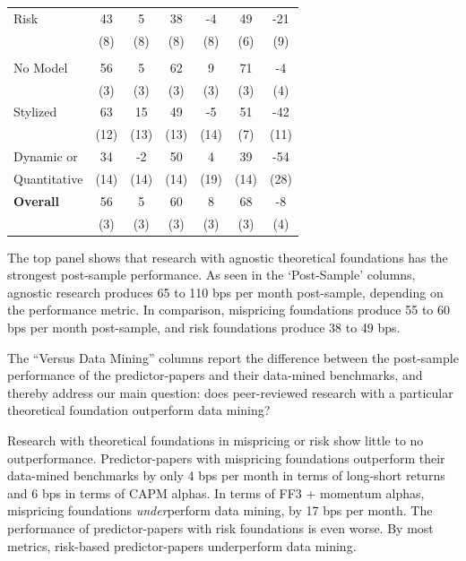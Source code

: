 \begin{table}[!h]
\begin{center}
\begin{tabular}{lcccccc}
      Risk              & 43 & 5 & 38 & -4 & 49 & -21 \\
                        & (8) & (8) & (8) & (8) & (6) & (9) \\                        
      \addlinespace
      \multicolumn{7}{l}{\textbf{Equilibrium Modeling}} \\
      No Model          & 56 & 5 & 62 & 9 & 71 & -4 \\
                        & (3) & (3) & (3) & (3) & (3) & (4) \\
      Stylized          & 63 & 15 & 49 & -5 & 51 & -42 \\
                        & (12) & (13) & (13) & (14) & (7) & (11) \\
      Dynamic or        & 34 & -2 & 50 & 4 & 39 & -54 \\
      Quantitative      & (14) & (14) & (14) & (19) & (14) & (28) \\
      \addlinespace
      \textbf{Overall}  & 56 & 5 & 60 & 8 & 68 & -8 \\
                        & (3) & (3) & (3) & (3) & (3) & (4) \\
      \bottomrule
   \end{tabular}
   \end{center} 
\end{table}

The top panel shows that research with agnostic theoretical foundations has the strongest post-sample performance. As seen in the `Post-Sample' columns, agnostic research produces 65 to 110 bps per month post-sample, depending on the performance metric. In comparison, mispricing foundations produce 55 to 60 bps per month post-sample, and risk foundations produce 38 to 49 bps.

The ``Versus Data Mining'' columns report the difference between the post-sample performance of the predictor-papers and their data-mined benchmarks, and thereby address our main question: does peer-reviewed research with a particular theoretical foundation outperform data mining?

Research with theoretical foundations in mispricing or risk show little to no outperformance. Predictor-papers with mispricing foundations outperform their data-mined benchmarks by only 4 bps per month in terms of long-short returns and 6 bps in terms of CAPM alphas. In terms of FF3 + momentum alphas, mispricing foundations \emph{under}perform data mining, by 17 bps per month. The performance of predictor-papers with risk foundations is even worse. By most metrics, risk-based predictor-papers underperform data mining.

